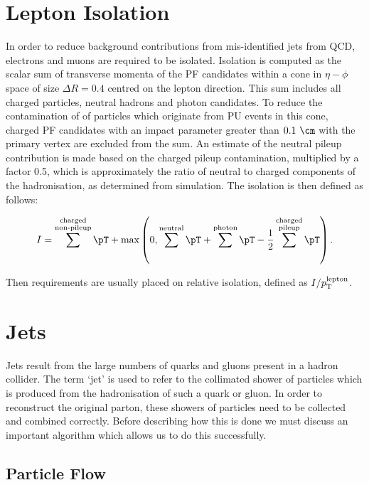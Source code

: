 \section{Lepton Isolation}
\label{sec:leptonisolation}

In order to reduce background contributions from mis-identified jets from QCD,
electrons and muons are required to be isolated. Isolation is computed as the
scalar sum of transverse momenta of the \ac{PF} candidates within a cone in
$\eta-\phi$ space of size $\Delta R = 0.4$ centred on the lepton direction. 
This sum includes all charged particles, neutral hadrons and photon candidates. 
To reduce the contamination of of particles which originate from \ac{PU} events 
in this cone, charged \ac{PF} candidates with an impact parameter greater than 
$0.1~\cm$ with the primary vertex are excluded from the sum. An estimate of the 
neutral pileup contribution is made based on the charged pileup contamination,
multiplied by a factor 0.5, which is approximately the ratio of neutral to
charged components of the hadronisation, as determined from simulation.   
The isolation is then defined as follows:

\begin{equation}
I = \sum^{\substack{\text{charged} \\ \text{non-pileup}}}\pT +
\text{max}\left(0,\sum^{\text{neutral}}\pT+\sum^{\text{photon}}\pT-\frac{1}{2}\sum^{\substack{\text{charged}
\\ \text{pileup}}}\pT\right).
\end{equation}

Then requirements are usually placed on relative isolation, defined as
$I / p_{\mathrm{T}}^{\text{lepton}}$.  

\section{Jets}
\label{sec:jets}

Jets result from the large numbers of quarks and gluons present in a hadron
collider. The term `jet' is used to refer to the collimated shower of particles
which is produced from the hadronisation of such a quark or gluon. In order to
reconstruct the original parton, these showers of particles need to be collected
and combined correctly. Before describing how this is done we must discuss an
important algorithm which allows us to do this successfully. 

\subsection{Particle Flow}
\label{sec:particleflow}

